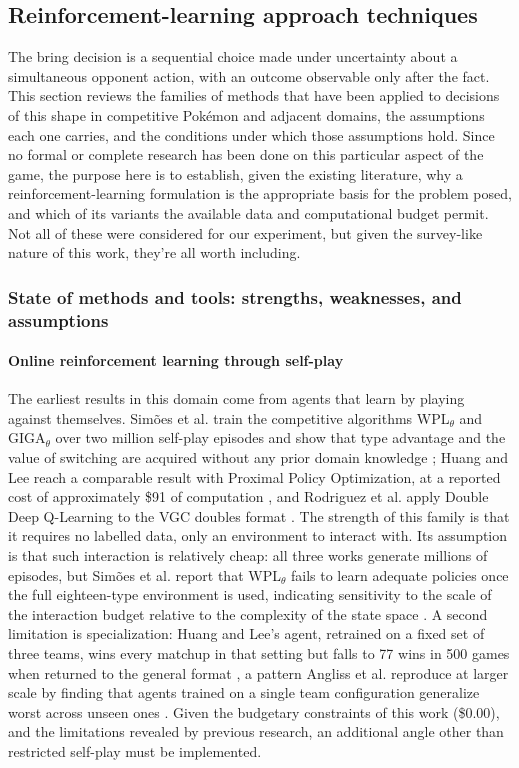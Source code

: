\documentclass[conference]{IEEEtran}
\begin{document}
\subsection{Reinforcement-learning approach techniques}
\label{sec:rltechniques}

The bring decision is a sequential choice made under uncertainty about a
simultaneous opponent action, with an outcome observable only after the fact.
This section reviews the families of methods that have been applied to
decisions of this shape in competitive Pok\'emon and adjacent domains, the
assumptions each one carries, and the conditions under which those assumptions
hold. Since no formal or complete research has been done on this particular aspect of the game, the purpose here is to establish, given the existing literature, why a reinforcement-learning formulation is the appropriate basis
for the problem posed, and which of its variants the available data and
computational budget permit. Not all of these were considered for our experiment, but given the survey-like nature of this work, they're all worth including.

\subsubsection{State of methods and tools: strengths, weaknesses, and assumptions}
\paragraph{Online reinforcement learning through self-play}
The earliest results in this domain come from agents that learn by playing
against themselves. Sim\~oes et al. train the competitive algorithms
WPL$_\theta$ and GIGA$_\theta$ over two million self-play episodes and show
that type advantage and the value of switching are acquired without any prior
domain knowledge \cite{simoes2020}; Huang and Lee reach a comparable result with Proximal Policy Optimization, at a reported cost of
approximately \$91 of computation \cite{huang2019}, and Rodriguez et
al. apply Double Deep Q-Learning to the VGC doubles format
\cite{rodriguez2024}. The strength of this family is that it requires no
labelled data, only an environment to interact with. Its assumption is that
such interaction is relatively cheap: all three works generate millions of episodes, but
Sim\~oes et al. report that WPL$_\theta$ fails to learn adequate policies once
the full eighteen-type environment is used, indicating sensitivity to the
scale of the interaction budget relative to the complexity of the state space
\cite{simoes2020}. A second limitation is specialization: Huang and Lee's agent,
retrained on a fixed set of three teams, wins every matchup in that setting but
falls to 77 wins in 500 games when returned to the general format
\cite{huang2019}, a pattern Angliss et al. reproduce at larger scale by finding
that agents trained on a single team configuration generalize worst across
unseen ones \cite{angliss2026}. Given the budgetary constraints of this work (\$0.00), and the limitations revealed by previous research, an additional angle other than restricted self-play must be implemented.
\end{document}
